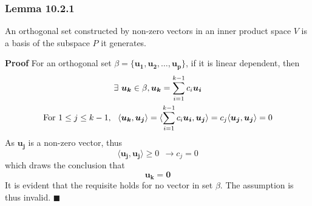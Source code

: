 \documentclass[11pt]{article}
\begin{document}
\subsubsection*{Lemma 10.2.1} An orthogonal set constructed by non-zero vectors in an inner product space $V$ is a basis of the subspace $P$ it generates. \par \noindent \textbf{Proof} For an orthogonal set $\beta = \{\bm{u_1}, \bm{u_2},\dots ,\bm{u_p}\}$, if it is linear dependent, then
\begin{gather}
    \exists~\bm{u_k} \in \beta, \bm{u_k} = \sum_{i=1}^{k-1}c_i\bm{u_i} \notag \\
    \text{For $1\leq j \leq k-1$},~~\langle \bm{u_k},\bm{u_j}\rangle = \langle \sum_{i=1}^{k-1}c_i\bm{u_i}, \bm{u_j} \rangle =c_j \langle \bm{u_j}, \bm{u_j} \rangle =0 \notag
\end{gather}
As $\bm{u_j}$ is a non-zero vector, thus
\begin{equation}
    \langle \bm{u_j},\bm{u_j} \rangle \geq 0~~\rightarrow c_j = 0
\end{equation}
which draws the conclusion that 
\begin{equation}
    \bm{u_k} = \bm{0}
\end{equation}
It is evident that the requisite holds for no vector in set $\beta$. The assumption is thus invalid. \hfill $\blacksquare$ \par \noindent 
\end{document}
